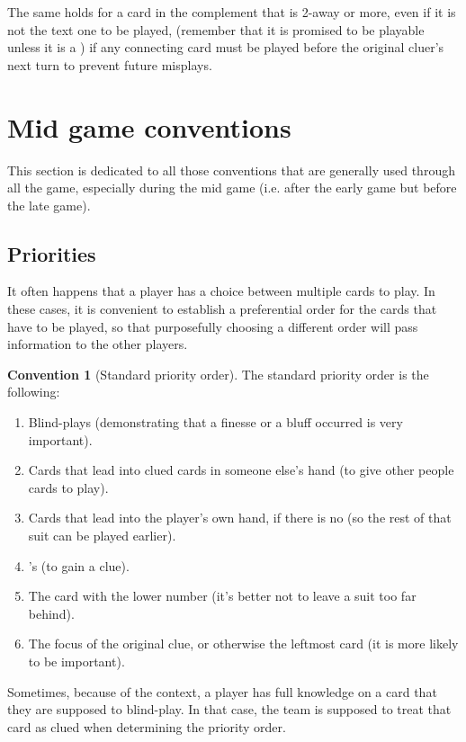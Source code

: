 \documentclass[a4paper]{article}
\theoremstyle{plain}
\theoremstyle{definition}
\newtheorem{convention}[theorem]{Convention}
\begin{document}
The same holds for a card in the complement that is 2-away or more, even if it is not the text one to be played, (remember that it is promised to be playable unless it is a ) if any connecting card must be played before the original cluer's next turn to prevent future misplays.

\section{Mid game conventions}

This section is dedicated to all those conventions that are generally used through all the game, especially during the mid game (i.e. after the early game but before the late game).

\subsection{Priorities}
\label{ssec:priorities}

It often happens that a player has a choice between multiple cards to play. In these cases, it is convenient to establish a preferential order for the cards that have to be played, so that purposefully choosing a different order will pass information to the other players.

\begin{convention}[Standard priority order]
	The standard priority order is the following:
	\begin{enumerate}
		\item Blind-plays (demonstrating that a finesse or a bluff occurred is very important).
		\item Cards that lead into clued cards in someone else's hand (to give other people cards to play).
		\item Cards that lead into the player's own hand, if there is no  (so the rest of that suit can be played earlier).
		\item {}'s (to gain a clue).
		\item The card with the lower number (it's better not to leave a suit too far behind).
		\item The focus of the original clue, or otherwise the leftmost card (it is more likely to be important).
	\end{enumerate}
\end{convention}

Sometimes, because of the context, a player has full knowledge on a card that they are supposed to blind-play. In that case, the team is supposed to treat that card as clued when determining the priority order.
\end{document}
